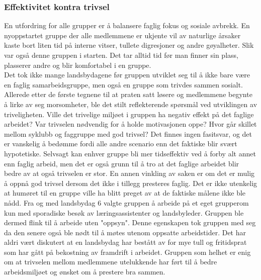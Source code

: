 \subsubsection{Effektivitet kontra trivsel}
En utfordring for alle grupper er å balansere faglig fokus og sosiale avbrekk.
En nyoppstartet gruppe der alle medlemmene er ukjente vil av naturlige årsaker kaste bort liten tid på interne vitser, tullete digresjoner og andre gøyalheter.
Slik var også denne gruppen i starten. Det tar alltid tid før man finner sin plass, plasserer andre og blir komfortabel i en gruppe.\\

Det tok ikke mange landsbydagene før gruppen utviklet seg til å ikke bare være en faglig samarbeidsgruppe, men også en gruppe som trivdes sammen sosialt. 
Allerede etter de første tegnene til at praten satt løsere og medlemmene begynte å lirke av seg morsomheter, ble det stilt reflekterende spørsmål ved utviklingen av triveligheten.
Ville det trivelige miljøet i gruppen ha negativ effekt på det faglige arbeidet?
Var trivselen nødvendig for å holde motivasjonen oppe? 
Hvor går skillet mellom syklubb og faggruppe med god trivsel?
Det finnes ingen fasitsvar, og det er vanskelig å bedømme fordi alle andre scenario enn det faktiske blir svært hypotetiske.
Selvsagt kan enhver gruppe bli mer tidseffektiv ved å forby alt annet enn faglig arbeid, men det er også grunn til å tro at det faglige arbeidet blir bedre av at også trivselen er stor.
En annen vinkling av saken er om det er mulig å oppnå god trivsel dersom det ikke i tillegg presteres faglig.
Det er ikke utenkelig at humøret til en gruppe ville ha blitt preget av at de faktiske målene ikke ble nådd.
Fra og med landsbydag 6 valgte gruppen å arbeide på et eget grupperom kun med sporadiske besøk av læringsassistenter og landsbyleder.
Gruppen ble dermed flink til å arbeide uten "oppsyn".
Denne egenskapen tok gruppen med seg da den senere også ble nødt til å møtes utenom oppsatte arbeidstider.
Det har aldri vært diskutert at en landsbydag har bestått av for mye tull og fritidsprat som har gått på bekostning av framdrift i arbeidet.
Gruppen som helhet er enig om at trivselen mellom medlemmene utelukkende har ført til å bedre arbeidsmiljøet og ønsket om å prestere bra sammen.
